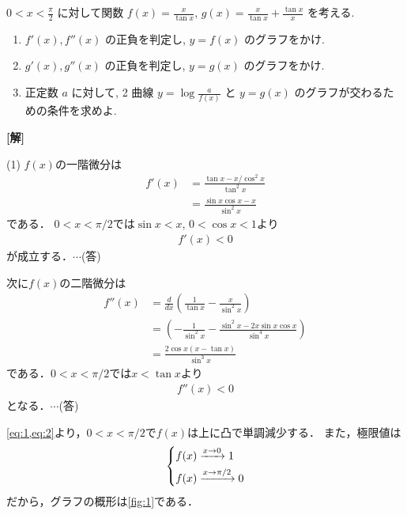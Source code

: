 \documentclass[a4paper,10pt]{ltjsarticle}
\begin{document}
\begin{oframed}
  $0 < x < \frac{\pi}{2}$ に対して関数 $\displaystyle f(x) = \frac{x}{\tan x}$, $\displaystyle g(x) = \frac{x}{\tan x} + \frac{\tan x}{x}$ を考える.
  \begin{enumerate}
    \item $f'(x), f''(x)$ の正負を判定し, $y=f(x)$ のグラフをかけ.
    \item $g'(x), g''(x)$ の正負を判定し, $y=g(x)$ のグラフをかけ.
    \item 正定数 $a$ に対して, 2 曲線 $y = \log \frac{a}{f(x)}$ と $y=g(x)$ のグラフが交わるための条件を求めよ.
  \end{enumerate}
\end{oframed}

\setlength{\columnseprule}{0.4pt}
\begin{multicols}{2}
  {\bf[解]}

  (1)
  $f(x)$の一階微分は
  \begin{align*}
    f'(x)
     & = \frac{\tan x - x/\cos^2 x}{\tan^2x} \\
     & = \frac{\sin x\cos x - x}{\sin^2 x}
  \end{align*}
  である．
  $0<x<\pi/2$では$\sin x < x$, $0<\cos x<1$より
  \begin{align}
    f'(x)<0 \label{eq:1}
  \end{align}
  が成立する．$\cdots$(答)

  次に$f(x)$の二階微分は
  \begin{align*}
    f''(x)
     & = \frac{d}{dx}\left( \frac{1}{\tan x} - \frac{x}{\sin^2 x} \right)            \\
     & = \left( -\frac{1}{\sin^2x} - \frac{\sin^2x-2x\sin x\cos x}{\sin^4 x} \right) \\
     & = \frac{2\cos x(x-\tan x)}{\sin^3 x}
  \end{align*}
  である．$0<x<\pi/2$では$x < \tan x$より
  \begin{align}
    f''(x) < 0 \label{eq:2}
  \end{align}
  となる．$\cdots$(答)

  \cref{eq:1,eq:2}より，$0<x<\pi/2$で$f(x)$は上に凸で単調減少する．
  また，極限値は
  \begin{align*}
    \begin{dcases}
      f(x) \xrightarrow{x \to 0} 1 \\
      f(x) \xrightarrow{x \to \pi/2} 0
    \end{dcases}
  \end{align*}
  だから，グラフの概形は\cref{fig:1}である．


\end{multicols}
\end{document}
